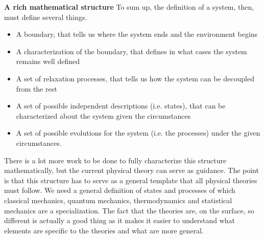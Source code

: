 \documentclass[10pt, onecolumn, longbibliography, nofootinbib]{revtex4-2}
\begin{document}
\textbf{A rich mathematical structure} To sum up, the definition of a system, then, must define several things.
\begin{itemize}
	\item A boundary, that tells us where the system ends and the environment begins
	\item A characterization of the boundary, that defines in what cases the system remains well defined
	\item A set of relaxation processes, that tells us how the system can be decoupled from the rest
	\item A set of possible independent descriptions (i.e. states), that can be characterized about the system given the circumstances
	\item A set of possible evolutions for the system (i.e. the processes) under the given circumstances.
\end{itemize}
There is a lot more work to be done to fully characterize this structure mathematically, but the current physical theory can serve as guidance. The point is that this structure has to serve as a general template that all physical theories must follow. We need a general definition of states and processes of which classical mechanics, quantum mechanics, thermodynamics and statistical mechanics are a specialization. The fact that the theories are, on the surface, so different is actually a good thing as it makes it easier to understand what elements are specific to the theories and what are more general.







\end{document}
